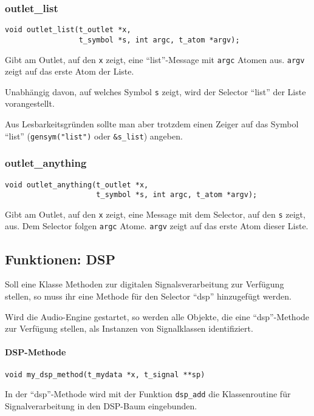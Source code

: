 \documentclass[12pt, a4paper,austrian, titlepage]{article}
\begin{document}
\begin{appendix}
\subsubsection{outlet\_list}
\begin{verbatim}
void outlet_list(t_outlet *x,
                 t_symbol *s, int argc, t_atom *argv);
\end{verbatim}
Gibt am Outlet, auf den \verb+x+ zeigt, eine ``list''-Message mit
\verb+argc+ Atomen aus.
\verb+argv+ zeigt auf das erste Atom der Liste.

Unabhängig davon, auf welches Symbol \verb+s+ zeigt, wird der Selector
``list'' der Liste vorangestellt.

Aus Lesbarkeitsgründen sollte man aber trotzdem einen Zeiger auf das
Symbol ``list'' (\verb+gensym("list")+ oder \verb+&s_list+) angeben.

\subsubsection{outlet\_anything}
\begin{verbatim}
void outlet_anything(t_outlet *x,
                     t_symbol *s, int argc, t_atom *argv);
\end{verbatim}
Gibt am Outlet, auf den \verb+x+ zeigt, eine Message mit
dem Selector, auf den \verb+s+ zeigt, aus.
Dem Selector folgen \verb+argc+ Atome.
\verb+argv+ zeigt auf das erste Atom dieser Liste.


\subsection{Funktionen: DSP}
Soll eine Klasse Methoden zur digitalen Signalsverarbeitung zur Verfügung stellen,
so muss ihr eine Methode für den Selector ``dsp'' hinzugefügt werden.

Wird die Audio-Engine gestartet, so werden alle Objekte, die eine ``dsp''-Methode
zur Verfügung stellen, als Instanzen von Signalklassen identifiziert.

\paragraph{DSP-Methode}

\begin{verbatim}
void my_dsp_method(t_mydata *x, t_signal **sp)
\end{verbatim}

In der ``dsp''-Methode wird mit der Funktion \verb+dsp_add+ die
Klassenroutine für Signalverarbeitung in den DSP-Baum eingebunden.


\end{appendix}
\end{document}
